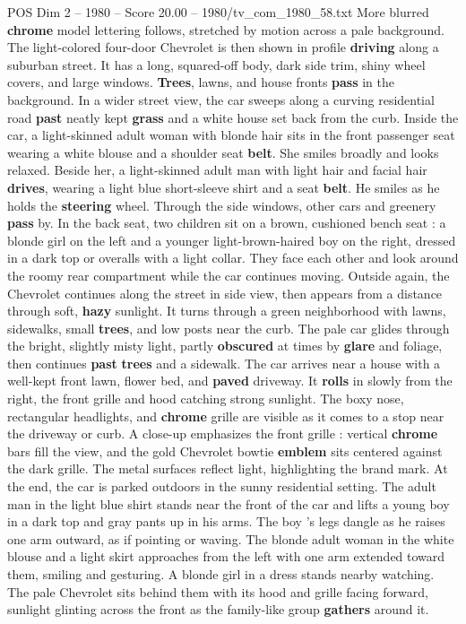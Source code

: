 \begin{textsample}{POS Dim 2 – 1980 – Score 20.00 – 1980/tv\_com\_1980\_58.txt}
More blurred \textbf{chrome} model lettering follows, stretched by motion across a pale background.
The light-colored four-door Chevrolet is then shown in profile \textbf{driving} along a suburban street.
It has a long, squared-off body, dark side trim, shiny wheel covers, and large windows. \textbf{Trees}, lawns, and house fronts \textbf{pass} in the background.
In a wider street view, the car sweeps along a curving residential road \textbf{past} neatly kept \textbf{grass} and a white house set back from the curb.
Inside the car, a light-skinned adult woman with blonde hair sits in the front passenger seat wearing a white blouse and a shoulder seat \textbf{belt}.
She smiles broadly and looks relaxed.
Beside her, a light-skinned adult man with light hair and facial hair \textbf{drives}, wearing a light blue short-sleeve shirt and a seat \textbf{belt}.
He smiles as he holds the \textbf{steering} wheel.
Through the side windows, other cars and greenery \textbf{pass} by.
In the back seat, two children sit on a brown, cushioned bench seat : a blonde girl on the left and a younger light-brown-haired boy on the right, dressed in a dark top or overalls with a light collar.
They face each other and look around the roomy rear compartment while the car continues moving.
Outside again, the Chevrolet continues along the street in side view, then appears from a distance through soft, \textbf{hazy} sunlight.
It turns through a green neighborhood with lawns, sidewalks, small \textbf{trees}, and low posts near the curb.
The pale car glides through the bright, slightly misty light, partly \textbf{obscured} at times by \textbf{glare} and foliage, then continues \textbf{past} \textbf{trees} and a sidewalk.
The car arrives near a house with a well-kept front lawn, flower bed, and \textbf{paved} driveway.
It \textbf{rolls} in slowly from the right, the front grille and hood catching strong sunlight.
The boxy nose, rectangular headlights, and \textbf{chrome} grille are visible as it comes to a stop near the driveway or curb.
A close-up emphasizes the front grille : vertical \textbf{chrome} bars fill the view, and the gold Chevrolet bowtie \textbf{emblem} sits centered against the dark grille.
The metal surfaces reflect light, highlighting the brand mark.
At the end, the car is parked outdoors in the sunny residential setting.
The adult man in the light blue shirt stands near the front of the car and lifts a young boy in a dark top and gray pants up in his arms.
The boy ’s legs dangle as he raises one arm outward, as if pointing or waving.
The blonde adult woman in the white blouse and a light skirt approaches from the left with one arm extended toward them, smiling and gesturing.
A blonde girl in a dress stands nearby watching.
The pale Chevrolet sits behind them with its hood and grille facing forward, sunlight glinting across the front as the family-like group \textbf{gathers} around it.

\end{textsample}

